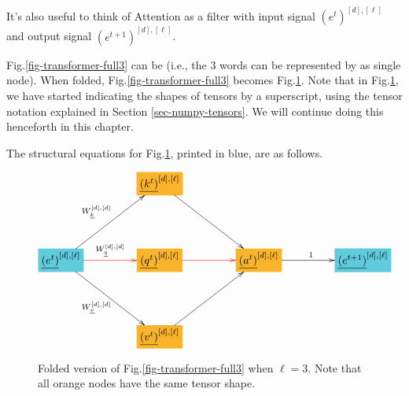 It's also useful to think of Attention
as a filter with input signal $(e^t)^{[d], [\ell]}$ and output signal
$(e^{t+1})^{[d], [\ell]}$.

Fig.\ref{fig-transformer-full3} can
be  (i.e., the 3 words can be
represented by as single node).
When folded, Fig.\ref{fig-transformer-full3}
becomes Fig.\ref{fig-transformer-recurrent-folded-1head}. Note that in Fig.\ref{fig-transformer-recurrent-folded-1head}, we have started indicating the
shapes of tensors by a superscript,
using the tensor notation
explained in Section \ref{sec-numpy-tensors}. We will continue doing this henceforth in this chapter.

The structural equations for
Fig.\ref{fig-transformer-recurrent-folded-1head}, printed in blue,
are as follows.




\begin{figure}[!h]\centering
$$\xymatrix@R=4pc@C=4pc{
&*+[F*:Dandelion]{\underline{(k^t)}^{[d],[\ell]}}\ar[dr]&&
\\
*+[F*:SkyBlue]{\underline{(e^t)}^{[d],[\ell]}}\ar[ur]^{W_\rvk^{[d], [d]}}\ar@[red][r]^{W_\rvq^{[d], [d]}}\ar[dr]_{W_\rvv^{[d], [d]}}&*+[F*:Dandelion]{\underline{(q^t)}^{[d],[\ell]}}\ar@[red][r]&*+[F*:Dandelion]{\underline{(a^t)}^{[d],[\ell]}}\ar[r]^{1}&*+[F*:SkyBlue]{\underline{(e^{t+1})}^{[d],[\ell]}}
\\
&*+[F*:Dandelion]{\underline{(v^t)}^{[d],[\ell]}}\ar[ur]&&
}$$
\caption{Folded version of
Fig.\ref{fig-transformer-full3} when $\ell=3$. Note that all orange nodes
have the same tensor shape.}
\label{fig-transformer-recurrent-folded-1head}
\end{figure}

